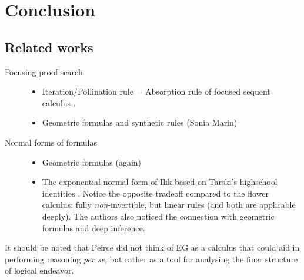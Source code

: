 


\section{Conclusion}


\subsection{Related works}

\begin{description}
  \item[Focusing proof search]
    \begin{itemize}
      \item Iteration/Pollination rule = Absorption rule of focused sequent
        calculus .
      \item Geometric formulas and synthetic rules (Sonia Marin)
    \end{itemize}
  \item[Normal forms of formulas]
    \begin{itemize}
      \item Geometric formulas (again)
      \item The exponential normal form of Ilik based on Tarski's highschool
  identities . Notice the opposite
  tradeoff compared to the flower calculus: fully \emph{non}-invertible, but
  linear rules (and both are applicable deeply). The authors also noticed the
  connection with geometric formulas and deep inference.
    \end{itemize} 
\end{description}

It should be noted that Peirce did not think of EG as a calculus that could aid
in performing reasoning \emph{per se}, but rather as a tool for analysing the
finer structure of logical endeavor.

